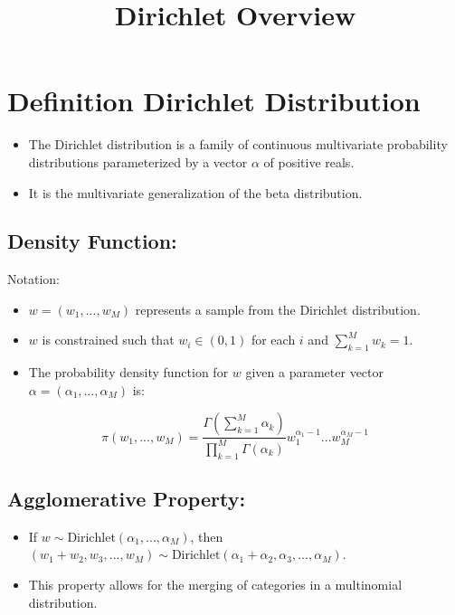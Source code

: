 \documentclass[10pt]{article}
\title{Dirichlet Overview}
\author{}
\date{}
\begin{document}
\maketitle

\section*{Definition Dirichlet Distribution}
\begin{itemize}
  \item The Dirichlet distribution is a family of continuous multivariate probability distributions parameterized by a vector \( \alpha \) of positive reals.
  \item It is the multivariate generalization of the beta distribution.
\end{itemize}



\subsection*{Density Function:}
Notation:

\begin{itemize}
  \item \( w = (w_1, ..., w_M) \) represents a sample from the Dirichlet distribution.
  \item \( w \) is constrained such that \( w_i \in (0, 1) \) for each \( i \) and \( \sum_{k=1}^M w_k = 1 \).
\end{itemize}

\begin{itemize}
  \item The probability density function for \( w \) given a parameter vector \( \alpha = (\alpha_1, ..., \alpha_M) \) is:
\end{itemize}

\[ \pi(w_1, ..., w_M) = \frac{\Gamma(\sum_{k=1}^M \alpha_k)}{\prod_{k=1}^M \Gamma(\alpha_k)} w_1^{\alpha_1 - 1} ... w_M^{\alpha_M - 1} \]

\subsection*{Agglomerative Property:}
\begin{itemize}
  \item If \( w \sim \text{Dirichlet}(\alpha_1, ..., \alpha_M) \), then \( (w_1 + w_2, w_3, ..., w_M) \sim \text{Dirichlet}(\alpha_1 + \alpha_2, \alpha_3, ..., \alpha_M) \).
  \item This property allows for the merging of categories in a multinomial distribution.
\end{itemize}
\end{document}
